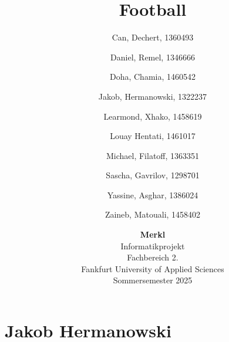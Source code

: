 \documentclass[12pt]{article}
\author{
	Can, Dechert, 1360493\\
	\and
	Daniel, Remel, 1346666\\
	\and
	Doha, Chamia, 1460542\\
	\and
	Jakob, Hermanowski, 1322237\\
	\and
	Learmond, Xhako, 1458619\\
	\and
	Louay Hentati, 1461017\\
	\and
	Michael, Filatoff, 1363351\\
	\and
	Sascha, Gavrilov, 1298701\\
	\and
	Yassine, Asghar, 1386024\\
	\and
	Zaineb, Matouali, 1458402\\
	\and
}
\title{Football}
\date{\vspace{0.5cm}
	\textbf{Merkl}
	\vspace{0.5cm} \\
	Informatikprojekt
	\vspace{0.5cm}\\
	Fachbereich 2.
	\vspace{0.5cm}\\
	Fankfurt University of Applied Sciences
	\vspace{0.5cm} \\
	Sommersemester 2025}
\begin{document}
\maketitle
\pagebreak
\tableofcontents
\pagebreak
\section{Jakob Hermanowski}

\end{document}
